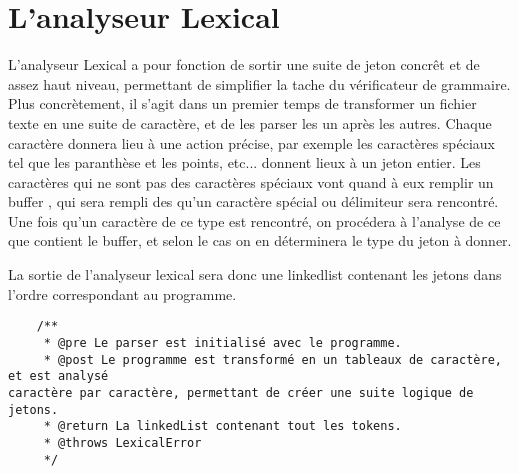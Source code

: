 \section{L'analyseur Lexical}

L'analyseur Lexical a pour fonction de sortir une suite de jeton concrêt et de assez haut niveau, permettant de simplifier la tache du vérificateur de grammaire. Plus concrètement, il s'agit dans un premier temps de transformer un fichier texte en une suite de caractère, et de les parser les un après les autres. Chaque caractère donnera lieu à une action précise, par exemple les caractères spéciaux tel que les paranthèse et les points, etc... donnent lieux à un jeton entier.
Les caractères qui ne sont pas des caractères spéciaux vont quand à eux remplir un buffer , qui sera rempli des qu'un caractère spécial ou délimiteur sera rencontré. Une fois qu'un caractère de ce type est rencontré, on procédera à l'analyse de ce que contient le buffer, et selon le cas on en déterminera le type du jeton à donner.

La sortie de l'analyseur lexical sera donc une linkedlist contenant les jetons dans l'ordre correspondant au programme.

\begin{verbatim}
	/**
	 * @pre Le parser est initialisé avec le programme.
	 * @post Le programme est transformé en un tableaux de caractère, et est analysé 
caractère par caractère, permettant de créer une suite logique de jetons.
	 * @return La linkedList contenant tout les tokens.
	 * @throws LexicalError
	 */
\end{verbatim}
